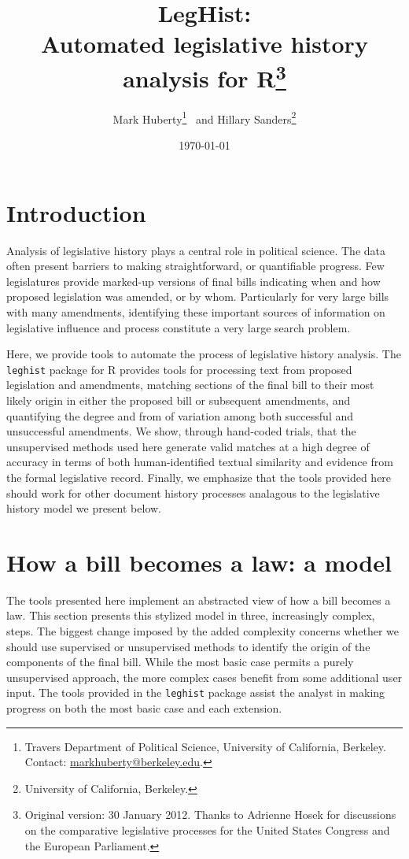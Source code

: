 \documentclass[11pt]{article}
\title{LegHist:\\ Automated legislative history analysis for
  R\thanks{Original version: 30 January 2012. Thanks to Adrienne Hosek for discussions on the
  comparative legislative processes for the United States Congress and
the European Parliament.}}
\author{Mark Huberty\thanks{Travers Department of Political Science,
    University of California, Berkeley. Contact:
    \url{markhuberty@berkeley.edu}.}~ and Hillary Sanders\thanks{University of
California, Berkeley.}}
\date{\today}
\begin{document}
%
\maketitle

\begin{abstract}
  
\end{abstract}

\section{Introduction}
\label{sec:introduction}

Analysis of legislative history plays a central role in political
science. The data often present barriers to making straightforward, or
quantifiable progress. Few legislatures provide marked-up versions of final bills
indicating when and how proposed legislation was amended, or by
whom. Particularly for very large bills with many amendments,
identifying these important sources of information on legislative
influence and process constitute a very large search problem. 

Here, we provide tools to automate the process of legislative history
analysis. The \texttt{leghist} package for R provides tools for
processing text from proposed legislation and amendments, matching
sections of the final bill to their most likely origin in either the
proposed bill or subsequent amendments, and quantifying the degree and
from of variation among both successful and unsuccessful
amendments. We show, through hand-coded trials, that the unsupervised
methods used here generate valid matches at a high degree of accuracy
in terms of both human-identified textual similarity and evidence from
the formal legislative record. Finally, we emphasize that the tools
provided here should work for other document history processes
analagous to the legislative history model we present below.

\section{How a bill becomes a law: a model}
\label{sec:how-bill-becomes}

The tools presented here implement an abstracted view of how a bill
becomes a law. This section presents this stylized model in three,
increasingly complex, steps. The biggest change imposed by the added
complexity concerns whether we should use supervised or unsupervised
methods to identify the origin of the components of the final
bill. While the most basic case permits a purely unsupervised
approach, the more complex cases benefit from some additional user
input. The tools provided in the
\texttt{leghist} package assist the analyst in making progress on both
the most basic case and each extension. 
\end{document}
